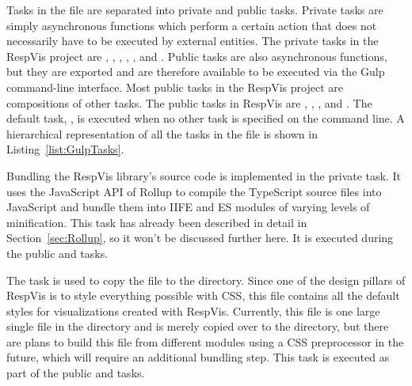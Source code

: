 Tasks in the  file are separated into private and
public tasks. Private tasks are simply asynchronous functions which
perform a certain action that does not necessarily have to be executed
by external entities. The private tasks in the RespVis project are
, , ,
, , and .
%
Public tasks are also asynchronous functions, but they are exported
and are therefore available to be executed via the Gulp command-line
interface. Most public tasks in the RespVis project are compositions
of other tasks. The public tasks in RespVis are ,
, , and . The default task,
, is executed when no other task is specified on the
command line. A hierarchical representation of all the tasks in the
 file is shown in Listing~\ref{list:GulpTasks}.

\begin{samepage}
%
A hierarchical representation of the tasks defined in the  file,
as output by the  command.
},
]{listings/gulp-tasks.txt}
\end{samepage}
  


Bundling the RespVis library's source code is implemented in the
private  task. It uses the JavaScript API of Rollup to
compile the TypeScript source files into JavaScript and bundle them
into IIFE and ES modules of varying levels of minification. This task
has already been described in detail in Section~\ref{sec:Rollup}, so
it won't be discussed further here. It is executed during the public
 and  tasks.

The  task is used to copy the 
file to the  directory. Since one of the design pillars of
RespVis is to style everything possible with CSS, this file contains
all the default styles for visualizations created with
RespVis. Currently, this file is one large single file in the
 directory and is merely copied over to the 
directory, but there are plans to build this file from different
modules using a CSS preprocessor in the future, which will require an
additional bundling step. This task is executed as part of the public
 and  tasks.

